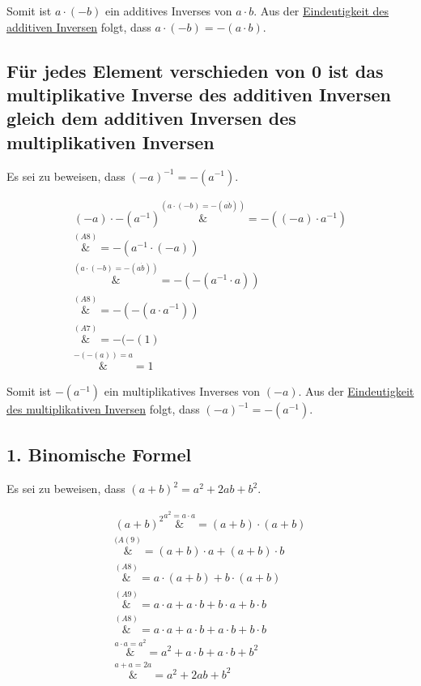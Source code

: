 \documentclass{article}
\begin{document}
Somit ist $a \cdot (-b)$ ein additives Inverses von $a \cdot b$. Aus der
\hyperref[eindeutigkeit_add_inv]{Eindeutigkeit des additiven Inversen}
folgt, dass $a \cdot (-b) = -(a \cdot b)$.


\subsection{Für jedes Element verschieden von 0 ist das multiplikative Inverse des additiven Inversen gleich dem additiven Inversen des multiplikativen Inversen}

Es sei zu beweisen, dass $(-a)^{-1} = -(a^{-1})$.

\begin{align*}
  (-a) \cdot -(a^{-1}) \overset{\hyperref[prod_add_inv]{(a \cdot (-b) = -(a \dot b))}}&= -((-a) \cdot a^{-1}) \\
                       \overset{\hyperref[a8]{(A8)}}&= -(a^{-1} \cdot (-a)) \\
                       \overset{\hyperref[prod_add_inv]{(a \cdot (-b) = -(a \dot b))}}&= -(-(a^{-1} \cdot a)) \\
                       \overset{\hyperref[a8]{(A8)}}&= -(-(a \cdot a^{-1})) \\
                       \overset{\hyperref[a7]{(A7)}}&= -(-(1) \\
                       \overset{\hyperref[add_add_inv]{-(-(a)) = a}}&= 1
\end{align*}

Somit ist $-(a^{-1})$ ein multiplikatives Inverses von $(-a)$. Aus der
\hyperref[eindeutigkeit_mul_inv]{Eindeutigkeit des multiplikativen Inversen}
folgt, dass $(-a)^{-1} = -(a^{-1})$.

\subsection{1. Binomische Formel}

Es sei zu beweisen, dass $(a + b)^2 = a^2 + 2ab + b^2$.

\begin{align*}
  (a + b)^2 \overset{a^2 = a \cdot a}&= (a + b) \cdot (a + b) \\
            \overset{\hyperref[a9]{(A(9)}}&= (a + b) \cdot a + (a + b) \cdot b \\
            \overset{\hyperref[a8]{(A8)}}&= a \cdot (a + b) + b \cdot (a + b) \\
            \overset{\hyperref[a9]{(A9)}}&= a \cdot a + a \cdot b + b \cdot a + b \cdot b \\
            \overset{\hyperref[a8]{(A8)}}&= a \cdot a + a \cdot b + a \cdot b + b \cdot b \\
            \overset{a \cdot a = a^2}&= a^2 + a \cdot b + a \cdot b + b^2 \\
            \overset{a + a = 2a}&= a^2 + 2ab + b^2
\end{align*}
\end{document}
